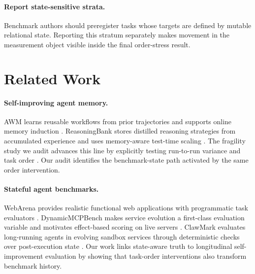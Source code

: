 \paragraph{Report state-sensitive strata.} Benchmark authors should preregister tasks whose targets are defined by mutable relational state. Reporting this stratum separately makes movement in the measurement object visible inside the final order-stress result.

\section{Related Work}
\paragraph{Self-improving agent memory.} AWM learns reusable workflows from prior trajectories and supports online memory induction \citep{wang2024awm}. ReasoningBank stores distilled reasoning strategies from accumulated experience and uses memory-aware test-time scaling \citep{ouyang2026reasoningbank}. The fragility study we audit advances this line by explicitly testing run-to-run variance and task order \citep{ye2026fragility}. Our audit identifies the benchmark-state path activated by the same order intervention.

\paragraph{Stateful agent benchmarks.} WebArena provides realistic functional web applications with programmatic task evaluators \citep{zhou2024webarena}. DynamicMCPBench makes service evolution a first-class evaluation variable and motivates effect-based scoring on live servers \citep{kaminski2026dynamicmcpbench}. ClawMark evaluates long-running agents in evolving sandbox services through deterministic checks over post-execution state \citep{meng2026clawmark}. Our work links state-aware truth to longitudinal self-improvement evaluation by showing that task-order interventions also transform benchmark history.
